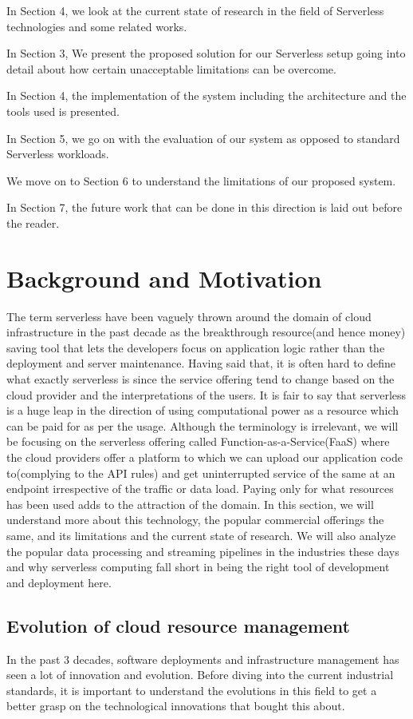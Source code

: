 \documentclass[12pt,titlepage]{article}
\begin{document}
In Section 4, we look at the current state of research in the field of
Serverless technologies and some related works.

In Section 3, We present the proposed solution for our Serverless setup going
into detail about how certain unacceptable limitations can be overcome.

In Section 4, the implementation of the system including the architecture and
the tools used is presented.

In Section 5, we go on with the evaluation of our system as opposed to standard
Serverless workloads.

We move on to Section 6 to understand the limitations of our proposed system.

In Section 7, the future work that can be done in this direction is laid out
before the reader.

\section{Background and Motivation}
\label{sec:orgee2d36e}
The term serverless have been vaguely thrown around the domain of cloud
infrastructure in the past decade as the breakthrough resource(and hence money)
saving tool that lets the developers focus on application logic rather than the
deployment and server maintenance. Having said that, it is often hard to define
what exactly serverless is since the service offering tend to change based on
the cloud provider and the interpretations of the users. It is fair to say that
serverless is a huge leap in the direction of using computational power as a
resource which can be paid for as per the usage.
Although the terminology is irrelevant, we will be focusing on the serverless
offering called Function-as-a-Service(FaaS) where the cloud providers offer a
platform to which we can upload our application code to(complying to the API
rules) and get uninterrupted service of the same at an endpoint irrespective of
the traffic or data load. Paying only for what resources has been used adds to
the attraction of the domain.
In this section, we will understand more about this technology, the
popular commercial offerings the same, and its limitations and the current state
of research. 
We will also analyze the popular data processing and streaming pipelines in the
industries these days and why serverless computing fall short in being the right
tool of development and deployment here.
\subsection{Evolution of cloud resource management}
\label{sec:org7e9252b}
In the past 3 decades, software deployments and infrastructure management has
seen a lot of innovation and evolution. Before diving into the current
industrial standards, it is important to understand the evolutions in this field
to get a better grasp on the technological innovations that bought this about.
\end{document}
